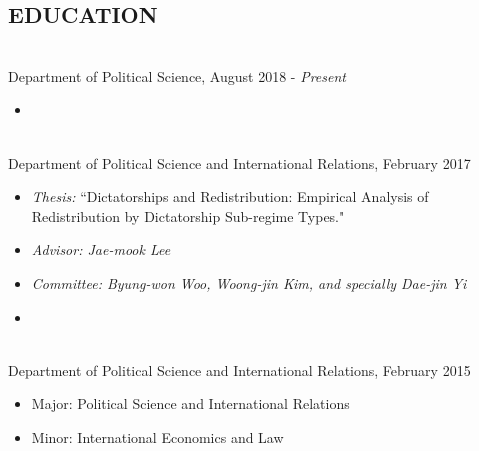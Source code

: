 \documentclass[11pt]{res} %
\begin{document}
\begin{resume}
                               
\section{EDUCATION} 
 \\
 Department of Political Science, August 2018 - \textit{Present}
\begin{itemize}
 	\item[]  \hspace*{-8mm} \underline{}
\end{itemize}
 \\
Department of Political Science and International Relations, February 2017
\begin{itemize} \itemsep -2pt 
	\item[] \hspace*{-8mm} \textit{Thesis:} ``Dictatorships and Redistribution: Empirical Analysis of Redistribution by Dictatorship Sub-regime Types."
	\item[] \hspace*{-5mm} \textit{Advisor: Jae-mook Lee}
	\item[] \hspace*{-5mm} \textit{Committee: Byung-won Woo, Woong-jin Kim, and specially Dae-jin Yi}
 	\item[]  \hspace*{-8mm} \underline{}
\end{itemize}

 \\
Department of Political Science and International Relations, February 2015
\begin{itemize} \itemsep -2pt 
	\item[] \hspace*{-8mm} Major: Political Science and International Relations
	\item[] \hspace*{-8mm} Minor: International Economics and Law
\end{itemize}


\end{resume}
\end{document}

